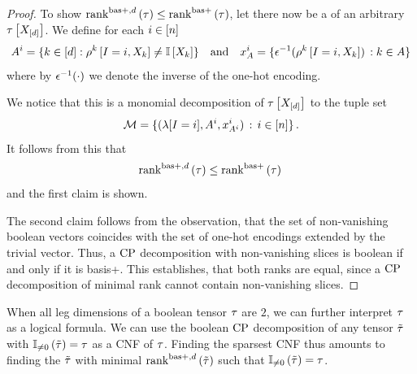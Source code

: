 \begin{proof}
    To show $\mathrm{rank}^{\mathrm{bas+},d}\left(\tau\right) \leq \mathrm{rank}^{\mathrm{bas+}}\left(\tau\right)$, let there now be a \basplusDecomposition{} of an arbitrary $\tau\left[X_{[d]}\right]$.
    We define for each $i\in[n]$
    \begin{align*}
        A^{i} = \{k\in[d] : \rho^{k}\left[I=i, X_{k}\right] \neq \mathbb{I}\left[X_{k}\right] \}
        \quad\text{and}\quad
        x_{A}^{i} = \{\epsilon^{-1}(\rho^{k}\left[I=i, X_{k}\right] ) \, : k\in A\}
    \end{align*}
    where by $\epsilon^{-1}(\cdot)$ we denote the inverse of the one-hot encoding.

    We notice that this is a monomial decomposition of $\tau\left[X_{[d]}\right]$ to the tuple set
    \begin{align*}
        \mathcal{M} = \{(\lambda[I=i], A^{i}, x_{A^{i}}^{i} ) \,:\, i\in[n] \} \, .
    \end{align*}
    It follows from this that
    \begin{align*}
        \mathrm{rank}^{\mathrm{bas+},d}\left(\tau\right) \leq \mathrm{rank}^{\mathrm{bas+}}\left(\tau\right) \,
    \end{align*}
    and the first claim is shown.

    The second claim follows from the observation, that the set of non-vanishing boolean vectors coincides with the set of one-hot encodings extended by the trivial vector.
    Thus, a $\mathrm{CP}$ decomposition with non-vanishing slices is boolean if and only if it is basis+.
    This establishes, that both ranks are equal, since a $\mathrm{CP}$ decomposition of minimal rank cannot contain non-vanishing slices.
\end{proof}

\begin{remark}
    When all leg dimensions of a boolean tensor $\tau$ are $2$, we can further interpret $\tau$ as a logical formula.
    We can use the boolean $\mathrm{CP}$ decomposition of any tensor $\tilde{\tau}$ with $\mathbb{I}_{\neq0}\left(\tilde{\tau}\right)=\tau$ as a CNF of $\tau$.
    Finding the sparsest CNF thus amounts to finding the $\tilde{\tau}$ with minimal $\mathrm{rank}^{\mathrm{bas+},d}\left(\tilde{\tau}\right)$ such that $\mathbb{I}_{\neq0}\left(\tilde{\tau}\right)=\tau$.
\end{remark}

